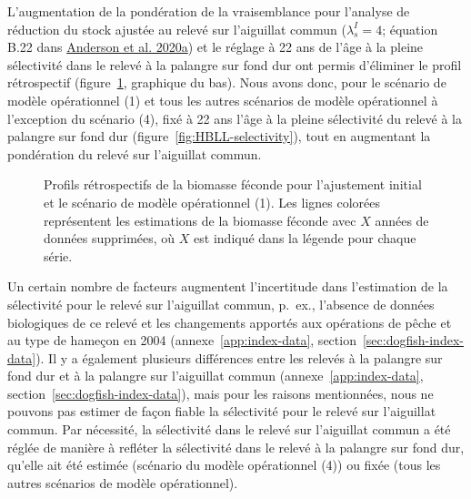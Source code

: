 \documentclass[11pt]{book}
\begin{document}
L'augmentation de la pondération de la vraisemblance pour l'analyse de réduction du stock ajustée au relevé sur l'aiguillat commun (\(\lambda^I_s = 4\); équation B.22 dans \protect\hyperlink{ref-anderson2020gfmp}{Anderson et al. 2020a}) et le réglage à 22 ans de l'âge à la pleine sélectivité dans le relevé à la palangre sur fond dur ont permis d'éliminer le profil rétrospectif (figure~\ref{fig:retro-initial}, graphique du bas). Nous avons donc, pour le scénario de modèle opérationnel (1) et tous les autres scénarios de modèle opérationnel à l'exception du scénario (4), fixé à 22 ans l'âge à la pleine sélectivité du relevé à la palangre sur fond dur (figure~\ref{fig:HBLL-selectivity}), tout en augmentant la pondération du relevé sur l'aiguillat commun.


\begin{figure}[htb]

{\centering {} 

}

\caption{Profils rétrospectifs de la biomasse féconde pour l'ajustement initial et le scénario de modèle opérationnel (1). Les lignes colorées représentent les estimations de la biomasse féconde avec \(X\) années de données supprimées, où \(X\) est indiqué dans la légende pour chaque série.}\label{fig:retro-initial}
\end{figure}
Un certain nombre de facteurs augmentent l'incertitude dans l'estimation de la sélectivité pour le relevé sur l'aiguillat commun, p.~ex., l'absence de données biologiques de ce relevé et les changements apportés aux opérations de pêche et au type de hameçon en 2004 (annexe~\ref{app:index-data}, section~\ref{sec:dogfish-index-data}). Il y a également plusieurs différences entre les relevés à la palangre sur fond dur et à la palangre sur l'aiguillat commun (annexe~\ref{app:index-data}, section~\ref{sec:dogfish-index-data}), mais pour les raisons mentionnées, nous ne pouvons pas estimer de façon fiable la sélectivité pour le relevé sur l'aiguillat commun. Par nécessité, la sélectivité dans le relevé sur l'aiguillat commun a été réglée de manière à refléter la sélectivité dans le relevé à la palangre sur fond dur, qu'elle ait été estimée (scénario du modèle opérationnel (4)) ou fixée (tous les autres scénarios de modèle opérationnel).
\end{document}
